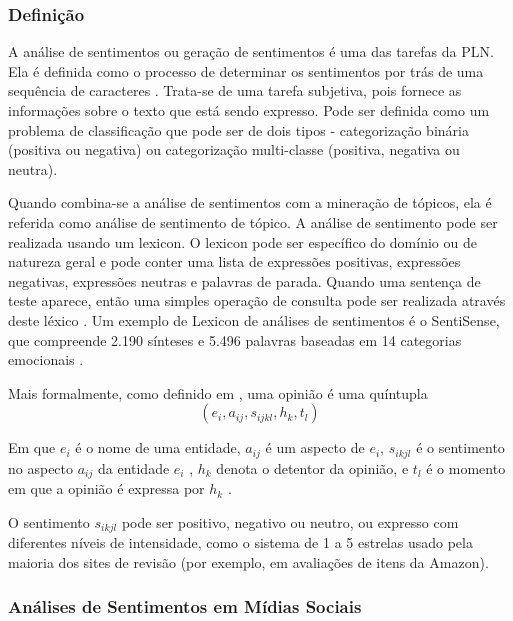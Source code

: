 \documentclass[
	12pt,				%
	openright,			%
	oneside,			%
	a4paper,			%
	english,			%
	spanish,			%
	brazil				%
	]{abntex2}
\begin{document}
	\subsubsection*{Definição}
	
	A análise de sentimentos ou geração de sentimentos é uma das tarefas da PLN. Ela é definida como o processo de determinar os sentimentos por trás de uma sequência de caracteres \cite{book_natlang_python}. Trata-se de uma tarefa subjetiva, pois fornece as informações sobre o texto que está sendo expresso. Pode ser definida como um problema de classificação que pode ser de dois tipos - categorização binária (positiva ou negativa) ou categorização multi-classe (positiva, negativa ou neutra). 
	
Quando combina-se a análise de sentimentos com a mineração de tópicos, ela é referida como análise de sentimento de tópico. A análise de sentimento pode ser realizada usando um lexicon. O lexicon pode ser específico do domínio ou de natureza geral e pode conter uma lista de expressões positivas, expressões negativas, expressões neutras e palavras de parada. Quando uma sentença de teste aparece, então uma simples operação de consulta pode ser realizada através deste léxico \cite{book_natlang_python}. Um exemplo de Lexicon de análises de sentimentos é o SentiSense, que compreende 2.190 sínteses e 5.496 palavras baseadas em 14 categorias emocionais \cite{carrilho}.

Mais formalmente, como definido em \cite{bliu_2012}, uma opinião é uma quíntupla \[ \left ( e_{i}, a_{ij}, s_{ijkl},h_{k},t_{l} \right ) \]


Em que $e_{i}$ é o nome de uma entidade, $a_{ij}$ é um aspecto de $e_{i}$, $s_{ikjl}$ é o sentimento no aspecto $a_{ij}$  da entidade $e_{i}$ , $h_{k}$ denota o detentor da opinião, e $t_{l}$  é o momento em que a opinião é expressa por $h_{k}$ .

O sentimento $s_{ikjl}$ pode ser positivo, negativo ou neutro, ou expresso com diferentes níveis de intensidade, como o sistema de 1 a 5 estrelas usado pela maioria dos sites de revisão (por exemplo, em avaliações de itens da Amazon).


	\subsubsection*{Análises de Sentimentos em Mídias Sociais}
	
\end{document}
